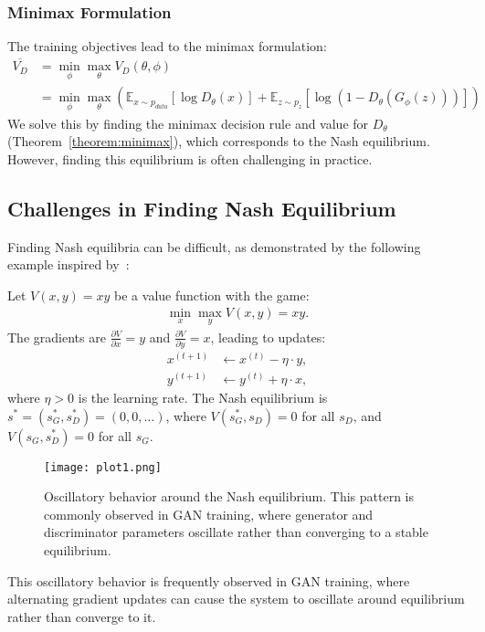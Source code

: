 \subsubsection{Minimax Formulation}
The training objectives lead to the minimax formulation:
\begin{align}
	\overline{V_D} & = \min_{\phi}\max_{\theta} V_D(\theta, \phi)                                                                                                      \\
	               & = \min_{\phi}\max_{\theta} \left( \mathbb{E}_{x \sim p_{data}}[\log D_\theta(x)] + \mathbb{E}_{z \sim p_z}[\log(1 - D_\theta(G_\phi(z)))] \right)
\end{align}
We solve this by finding the minimax decision rule and value for $D_\theta$ (Theorem~\ref{theorem:minimax}), which corresponds to the Nash equilibrium. However, finding this equilibrium is often challenging in practice.
\subsection{Challenges in Finding Nash Equilibrium}%
\label{sec:difficulty}
Finding Nash equilibria can be difficult, as demonstrated by the following example inspired by~\cite{ref:weng-2017}:
\begin{example}
	Let $V(x, y) = xy$ be a value function with the game:
	\begin{align}
		\min_x \max_y V(x, y) = xy.
	\end{align}
	The gradients are $\frac{\partial V}{\partial x} = y$ and $\frac{\partial V}{\partial y} = x$, leading to updates:
	\begin{align}
		x^{(t+1)} & \gets x^{(t)} - \eta \cdot y, \\
		y^{(t+1)} & \gets y^{(t)} + \eta \cdot x,
	\end{align}
	where $\eta > 0$ is the learning rate.
	The Nash equilibrium is $s^* = (s_G^*, s_D^*) = (0, 0, \dots)$, where $V(s_G^*, s_D) = 0$ for all $s_D$, and $V(s_G, s_D^*) = 0$ for all $s_G$.
	\begin{figure}[H]
		\centering
		\texttt{[image: plot1.png]}
		\caption{Oscillatory behavior around the Nash equilibrium. This pattern is commonly observed in GAN training, where generator and discriminator parameters oscillate rather than converging to a stable equilibrium.}%
		\label{fig:alternating}
	\end{figure}
\end{example}
This oscillatory behavior is frequently observed in GAN training, where alternating gradient updates can cause the system to oscillate around equilibrium rather than converge to it.
